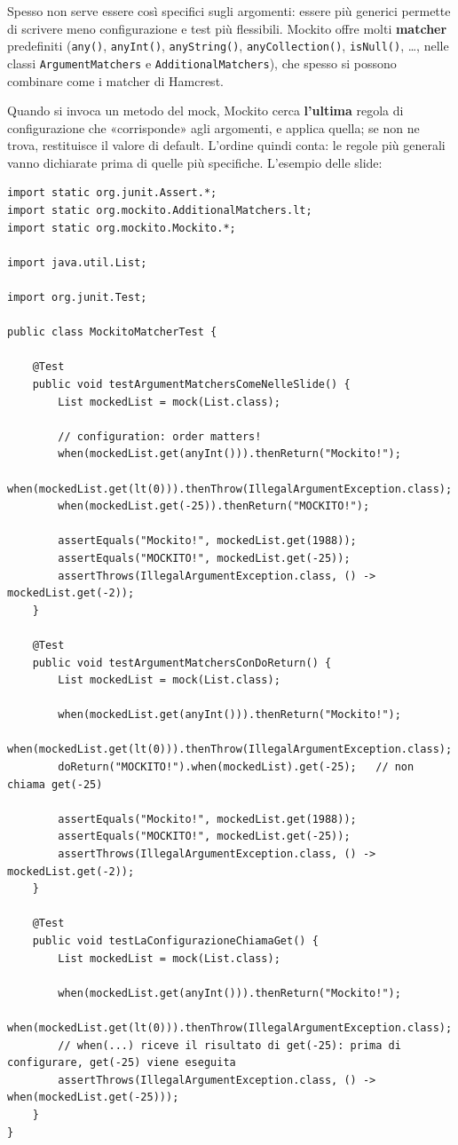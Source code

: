 Spesso non serve essere così specifici sugli argomenti: essere più generici permette di scrivere meno configurazione e
test più flessibili. Mockito offre molti \textbf{matcher} predefiniti (\texttt{any()}, \texttt{anyInt()},
\texttt{anyString()}, \texttt{anyCollection()}, \texttt{isNull()}, \ldots, nelle classi \texttt{ArgumentMatchers} e
\texttt{AdditionalMatchers}), che spesso si possono combinare come i matcher di Hamcrest.

Quando si invoca un metodo del mock, Mockito cerca \textbf{l'ultima} regola di configurazione che «corrisponde» agli
argomenti, e applica quella; se non ne trova, restituisce il valore di default. L'ordine quindi conta: le regole più
generali vanno dichiarate prima di quelle più specifiche. L'esempio delle slide:

\begin{lstlisting}[style=java, name=MockitoMatcherTest.java]
import static org.junit.Assert.*;
import static org.mockito.AdditionalMatchers.lt;
import static org.mockito.Mockito.*;

import java.util.List;

import org.junit.Test;

public class MockitoMatcherTest {

    @Test
    public void testArgumentMatchersComeNelleSlide() {
        List mockedList = mock(List.class);

        // configuration: order matters!
        when(mockedList.get(anyInt())).thenReturn("Mockito!");
        when(mockedList.get(lt(0))).thenThrow(IllegalArgumentException.class);
        when(mockedList.get(-25)).thenReturn("MOCKITO!");

        assertEquals("Mockito!", mockedList.get(1988));
        assertEquals("MOCKITO!", mockedList.get(-25));
        assertThrows(IllegalArgumentException.class, () -> mockedList.get(-2));
    }

    @Test
    public void testArgumentMatchersConDoReturn() {
        List mockedList = mock(List.class);

        when(mockedList.get(anyInt())).thenReturn("Mockito!");
        when(mockedList.get(lt(0))).thenThrow(IllegalArgumentException.class);
        doReturn("MOCKITO!").when(mockedList).get(-25);   // non chiama get(-25)

        assertEquals("Mockito!", mockedList.get(1988));
        assertEquals("MOCKITO!", mockedList.get(-25));
        assertThrows(IllegalArgumentException.class, () -> mockedList.get(-2));
    }

    @Test
    public void testLaConfigurazioneChiamaGet() {
        List mockedList = mock(List.class);

        when(mockedList.get(anyInt())).thenReturn("Mockito!");
        when(mockedList.get(lt(0))).thenThrow(IllegalArgumentException.class);
        // when(...) riceve il risultato di get(-25): prima di configurare, get(-25) viene eseguita
        assertThrows(IllegalArgumentException.class, () -> when(mockedList.get(-25)));
    }
}
\end{lstlisting}

